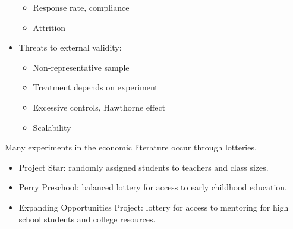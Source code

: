 \documentclass[10pt]{extarticle}
\begin{document}
\begin{itemize}
\begin{itemize}
        \item Response rate, compliance
        \item Attrition
      \end{itemize}
    \item Threats to external validity:
      \begin{itemize}
        \item Non-representative sample
        \item Treatment depends on experiment
        \item Excessive controls, Hawthorne effect
        \item Scalability
      \end{itemize}
  \end{itemize}
  Many experiments in the economic literature occur through lotteries.
  \begin{itemize}
    \item Project Star: randomly assigned students to teachers and class sizes.
    \item Perry Preschool: balanced lottery for access to early childhood education.
    \item Expanding Opportunities Project: lottery for access to mentoring for high school students and college resources.
  \end{itemize}
\end{document}
